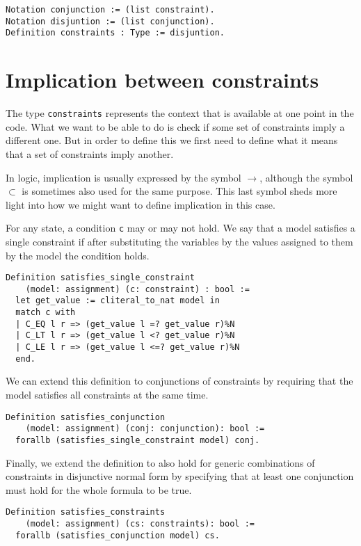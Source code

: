 \begin{verbatim}
Notation conjunction := (list constraint).
Notation disjuntion := (list conjunction).
Definition constraints : Type := disjuntion.
\end{verbatim}

\section{Implication between constraints}

The type \texttt{constraints} represents the context that is available at one point in the 
code. What we want to be able to do is check if some set of constraints imply a different one. But in 
order to define this we first need to define what it means that a set of constraints imply another.

In logic, implication is usually expressed by the symbol $\rightarrow$, although the symbol $\subset$ 
is sometimes also used for the same purpose. This last symbol sheds more light into how we might want 
to define implication in this case.

For any state, a condition \texttt{c} may or may not hold. We say that a model satisfies a 
single constraint if after substituting the variables by the values assigned to them by the model the 
condition holds.

\begin{verbatim}
Definition satisfies_single_constraint 
    (model: assignment) (c: constraint) : bool :=
  let get_value := cliteral_to_nat model in 
  match c with
  | C_EQ l r => (get_value l =? get_value r)%N
  | C_LT l r => (get_value l <? get_value r)%N
  | C_LE l r => (get_value l <=? get_value r)%N
  end.
\end{verbatim}

We can extend this definition to conjunctions of constraints by requiring that the model satisfies all 
constraints at the same time.

\begin{verbatim}
Definition satisfies_conjunction 
    (model: assignment) (conj: conjunction): bool :=
  forallb (satisfies_single_constraint model) conj.
\end{verbatim}

Finally, we extend the definition to also hold for generic combinations of constraints in disjunctive 
normal form by specifying that at least one conjunction must hold for the whole formula to be true.

\begin{verbatim}
Definition satisfies_constraints 
    (model: assignment) (cs: constraints): bool :=
  forallb (satisfies_conjunction model) cs.
\end{verbatim}

